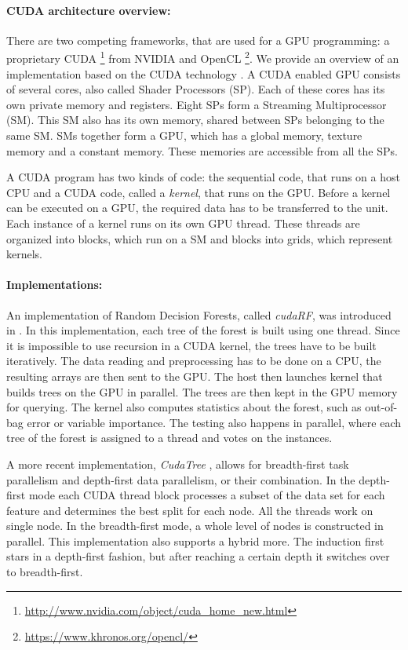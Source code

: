 \documentclass[thesis=B,english]{FITthesis}[2012/10/20]
\begin{document}
	\paragraph*{CUDA architecture overview:} There are two competing frameworks, that are used for a GPU programming: a proprietary CUDA \footnote{\url{http://www.nvidia.com/object/cuda_home_new.html}} from NVIDIA and OpenCL \footnote{\url{https://www.khronos.org/opencl/}}. We provide an overview of an implementation based on the CUDA technology \cite{grahn2011cudarf}. A CUDA enabled GPU consists of several cores, also called Shader Processors (SP). Each of these cores has its own private memory and registers. Eight SPs form a Streaming Multiprocessor (SM). This SM also has its own memory, shared between SPs belonging to the same SM. SMs together form a GPU, which has a global memory, texture memory and a constant memory. These memories are accessible from all the SPs. 

	A CUDA program has two kinds of code: the sequential code, that runs on a host CPU and a CUDA code, called a \emph{kernel}, that runs on the GPU. Before a kernel can be executed on a GPU, the required data has to be transferred to the unit. Each instance of a kernel runs on its own GPU thread. These threads are organized into blocks, which run on a SM and blocks into grids, which represent kernels.

	\paragraph*{Implementations:} An implementation of Random Decision Forests, called \textit{cudaRF}, was introduced in \cite{grahn2011cudarf}. In this implementation, each tree of the forest is built using one thread. Since it is impossible to use recursion in a CUDA kernel, the trees have to be built iteratively. The data reading and preprocessing has to be done on a CPU, the resulting arrays are then sent to the GPU. The host then launches kernel that builds trees on the GPU in parallel. The trees are then kept in the GPU memory for querying. The kernel also computes statistics about the forest, such as out-of-bag error or variable importance. The testing also happens in parallel, where each tree of the forest is assigned to a thread and votes on the instances.

	A more recent implementation, \textit{CudaTree} \cite{liao2013learning}, allows for breadth-first task parallelism and depth-first data parallelism, or their combination. In the depth-first mode each CUDA thread block processes a subset of the data set for each feature and determines the best split for each node. All the threads work on single node. In the breadth-first mode, a whole level of nodes is constructed in parallel. This implementation also supports a hybrid more. The induction first stars in a depth-first fashion, but after reaching a certain depth it switches over to breadth-first. 
\end{document}
